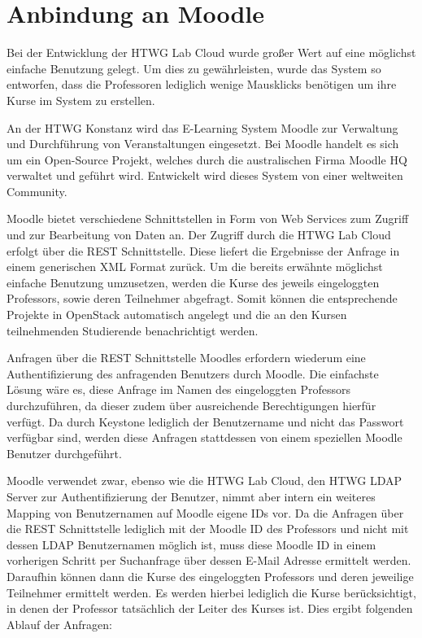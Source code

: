 \section{Anbindung an Moodle}
Bei der Entwicklung der HTWG Lab Cloud wurde großer Wert auf eine möglichst einfache Benutzung gelegt. Um dies zu gewährleisten, wurde das System so entworfen, dass die Professoren lediglich wenige Mausklicks benötigen um ihre Kurse im System zu erstellen.

An der HTWG Konstanz wird das E-Learning System Moodle zur Verwaltung und Durchführung von Veranstaltungen eingesetzt. Bei Moodle handelt es sich um ein Open-Source Projekt, welches durch die australischen Firma Moodle HQ verwaltet und geführt wird. Entwickelt wird dieses System von einer weltweiten Community.

Moodle bietet verschiedene Schnittstellen in Form von Web Services zum Zugriff und zur Bearbeitung von Daten an. Der Zugriff durch die HTWG Lab Cloud erfolgt über die REST Schnittstelle. Diese liefert die Ergebnisse der Anfrage in einem generischen XML Format zurück.
Um die bereits erwähnte möglichst einfache Benutzung umzusetzen, werden die Kurse des jeweils eingeloggten Professors, sowie deren Teilnehmer abgefragt. Somit können die entsprechende Projekte in OpenStack automatisch angelegt und die an den Kursen teilnehmenden Studierende benachrichtigt werden.

Anfragen über die REST Schnittstelle Moodles erfordern wiederum eine Authentifizierung des anfragenden Benutzers durch Moodle. Die einfachste Lösung wäre es, diese Anfrage im Namen des eingeloggten Professors durchzuführen, da dieser zudem über ausreichende Berechtigungen hierfür verfügt. Da durch Keystone lediglich der Benutzername und nicht das Passwort verfügbar sind, werden diese Anfragen stattdessen von einem speziellen Moodle Benutzer durchgeführt.

Moodle verwendet zwar, ebenso wie die HTWG Lab Cloud, den HTWG LDAP Server zur Authentifizierung der Benutzer, nimmt aber intern ein weiteres Mapping von Benutzernamen auf Moodle eigene IDs vor. Da die Anfragen über die REST Schnittstelle lediglich mit der Moodle ID des Professors und nicht mit dessen LDAP Benutzernamen möglich ist, muss diese Moodle ID in einem vorherigen Schritt per Suchanfrage über dessen E-Mail Adresse ermittelt werden. Daraufhin können dann die Kurse des eingeloggten Professors und deren jeweilige Teilnehmer ermittelt werden. Es werden hierbei lediglich die Kurse berücksichtigt, in denen der Professor tatsächlich der Leiter des Kurses ist. Dies ergibt folgenden Ablauf der Anfragen:

